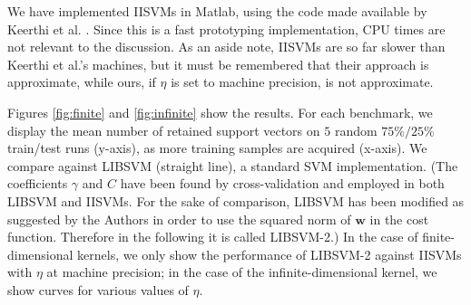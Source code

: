 \documentclass[10pt,twocolumn,letterpaper]{article}
\def\ww{\mathbf{w}}
\begin{document}
We have implemented IISVMs in Matlab, using the code made available by
Keerthi et al. \cite{KeerthiCDC06}. Since this is a fast prototyping
implementation, CPU times are not relevant to the discussion. As an
aside note, IISVMs are so far slower than Keerthi et al.'s machines,
but it must be remembered that their approach is approximate, while
ours, if $\eta$ is set to machine precision, is not approximate.

Figures \ref{fig:finite} and \ref{fig:infinite} show the results. For
each benchmark, we display the mean number of retained support vectors
on $5$ random $75\%/25\%$ train/test runs (y-axis), as more training
samples are acquired (x-axis). We compare against LIBSVM
\cite{ChangL01} (straight line), a standard SVM implementation. (The
coefficients $\gamma$ and $C$ have been found by cross-validation and
employed in both LIBSVM and IISVMs. For the sake of comparison, LIBSVM
has been modified as suggested by the Authors in order to use the
squared norm of $\ww$ in the cost function. Therefore in the following
it is called LIBSVM-2.) In the case of finite-dimensional kernels, we
only show the performance of LIBSVM-2 against IISVMs with $\eta$ at
machine precision; in the case of the infinite-dimensional kernel, we
show curves for various values of $\eta$.
\end{document}

